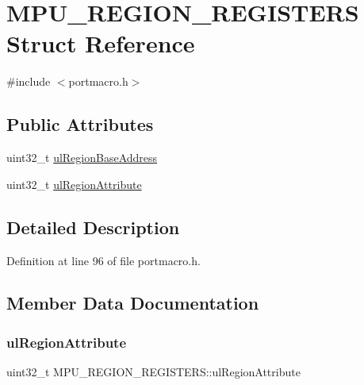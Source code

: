 \hypertarget{struct_m_p_u___r_e_g_i_o_n___r_e_g_i_s_t_e_r_s}{}\section{M\+P\+U\+\_\+\+R\+E\+G\+I\+O\+N\+\_\+\+R\+E\+G\+I\+S\+T\+E\+RS Struct Reference}
\label{struct_m_p_u___r_e_g_i_o_n___r_e_g_i_s_t_e_r_s}


{\ttfamily \#include $<$portmacro.\+h$>$}

\subsection*{Public Attributes}
\begin{DoxyCompactItemize}
\item 
uint32\+\_\+t \hyperlink{struct_m_p_u___r_e_g_i_o_n___r_e_g_i_s_t_e_r_s_a31d889401a490033e2224d9a90934eb1}{ul\+Region\+Base\+Address}
\item 
uint32\+\_\+t \hyperlink{struct_m_p_u___r_e_g_i_o_n___r_e_g_i_s_t_e_r_s_a6f33d6011da06410a3c05fb0a3aa9a6d}{ul\+Region\+Attribute}
\end{DoxyCompactItemize}


\subsection{Detailed Description}


Definition at line 96 of file portmacro.\+h.



\subsection{Member Data Documentation}
\mbox{\label{struct_m_p_u___r_e_g_i_o_n___r_e_g_i_s_t_e_r_s_a6f33d6011da06410a3c05fb0a3aa9a6d}} 
\subsubsection{\texorpdfstring{ul\+Region\+Attribute}{ulRegionAttribute}}
{\footnotesize\ttfamily uint32\+\_\+t M\+P\+U\+\_\+\+R\+E\+G\+I\+O\+N\+\_\+\+R\+E\+G\+I\+S\+T\+E\+R\+S\+::ul\+Region\+Attribute}



